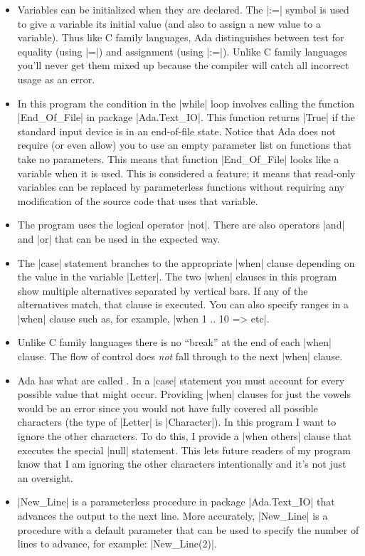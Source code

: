 \begin{itemize}
\item Variables can be initialized when they are declared. The |:=| symbol is used to give a
  variable its initial value (and also to assign a new value to a variable). Thus like C family
  languages, Ada distinguishes between test for equality (using |=|) and assignment (using
  |:=|). Unlike C family languages you'll never get them mixed up because the compiler will
  catch all incorrect usage as an error.

\item In this program the condition in the |while| loop involves calling the function
  |End_Of_File| in package |Ada.Text_IO|. This function returns |True| if the standard input
  device is in an end-of-file state. Notice that Ada does not require (or even allow) you to use
  an empty parameter list on functions that take no parameters. This means that function
  |End_Of_File| looks like a variable when it is used. This is considered a feature; it means
  that read-only variables can be replaced by parameterless functions without requiring any
  modification of the source code that uses that variable.

\item The program uses the logical operator |not|. There are also operators |and| and |or| that
  can be used in the expected way.

\item The |case| statement branches to the appropriate |when| clause depending on the value in
  the variable |Letter|. The two |when| clauses in this program show multiple alternatives
  separated by vertical bars. If any of the alternatives match, that clause is executed. You can
  also specify ranges in a |when| clause such as, for example, |when 1 .. 10 => etc|.

\item Unlike C family languages there is no ``break'' at the end of each |when| clause. The flow
  of control does \emph{not} fall through to the next |when| clause.

\item Ada has what are called . In a |case| statement you must
  account for every possible value that might occur. Providing |when| clauses for just the
  vowels would be an error since you would not have fully covered all possible characters (the
  type of |Letter| is |Character|). In this program I want to ignore the other characters. To do
  this, I provide a |when others| clause that executes the special |null| statement. This lets
  future readers of my program know that I am ignoring the other characters intentionally and
  it's not just an oversight.

\item |New_Line| is a parameterless procedure in package |Ada.Text_IO| that advances the output
  to the next line. More accurately, |New_Line| is a procedure with a default parameter that can
  be used to specify the number of lines to advance, for example: |New_Line(2)|.
\end{itemize}

